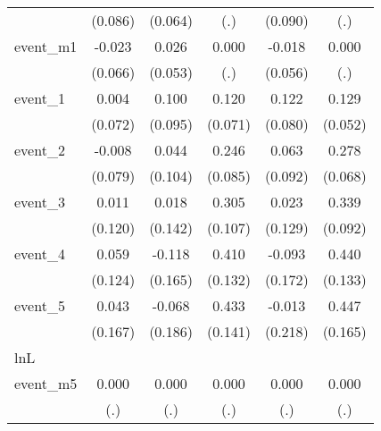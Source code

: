 {\begin{tabular}{l*{5}{c}}
            &     (0.086)         &     (0.064)         &         (.)         &     (0.090)         &         (.)         \\
[1em]
event\_m1    &      -0.023         &       0.026         &       0.000         &      -0.018         &       0.000         \\
            &     (0.066)         &     (0.053)         &         (.)         &     (0.056)         &         (.)         \\
[1em]
event\_1     &       0.004         &       0.100         &       0.120         &       0.122         &       0.129\sym{*}  \\
            &     (0.072)         &     (0.095)         &     (0.071)         &     (0.080)         &     (0.052)         \\
[1em]
event\_2     &      -0.008         &       0.044         &       0.246\sym{**} &       0.063         &       0.278\sym{***}\\
            &     (0.079)         &     (0.104)         &     (0.085)         &     (0.092)         &     (0.068)         \\
[1em]
event\_3     &       0.011         &       0.018         &       0.305\sym{**} &       0.023         &       0.339\sym{***}\\
            &     (0.120)         &     (0.142)         &     (0.107)         &     (0.129)         &     (0.092)         \\
[1em]
event\_4     &       0.059         &      -0.118         &       0.410\sym{**} &      -0.093         &       0.440\sym{***}\\
            &     (0.124)         &     (0.165)         &     (0.132)         &     (0.172)         &     (0.133)         \\
[1em]
event\_5     &       0.043         &      -0.068         &       0.433\sym{**} &      -0.013         &       0.447\sym{**} \\
            &     (0.167)         &     (0.186)         &     (0.141)         &     (0.218)         &     (0.165)         \\
\hline
lnL         &                     &                     &                     &                     &                     \\
event\_m5    &       0.000         &       0.000         &       0.000         &       0.000         &       0.000         \\
            &         (.)         &         (.)         &         (.)         &         (.)         &         (.)         \\

\end{tabular}}
